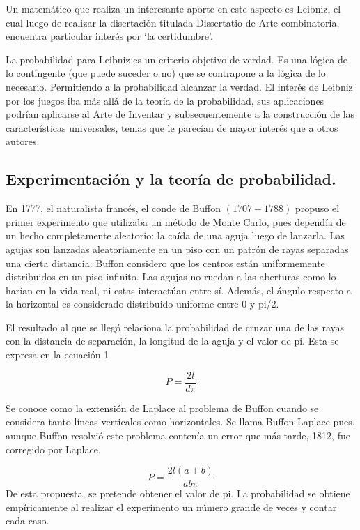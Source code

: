 \documentclass{rbf}
\begin{document}
Un matemático que realiza un interesante aporte en este aspecto es Leibniz, el cual luego de realizar la disertación titulada Dissertatio de Arte combinatoria, encuentra particular interés por ‘la certidumbre’.

La probabilidad para Leibniz es un criterio objetivo de verdad. Es una lógica de lo contingente (que puede suceder o no) que se contrapone a la lógica de lo necesario. Permitiendo a la probabilidad alcanzar la verdad. El interés de Leibniz por los juegos iba más allá de la teoría de la probabilidad, sus aplicaciones podrían aplicarse al Arte de Inventar y subsecuentemente a la construcción de las características universales, temas que le parecían de mayor interés que a otros autores.\cite{Charles}
\subsection{Experimentación y la teoría de probabilidad.}
En 1777, el naturalista francés, el conde de Buffon $(1707-1788)$ propuso el primer experimento que utilizaba un método de Monte Carlo, pues dependía de un hecho completamente aleatorio: la caída de una aguja luego de lanzarla. Las agujas son lanzadas aleatoriamente en un piso con un patrón de rayas separadas una cierta distancia. Buffon considero que los centros están uniformemente distribuidos en un piso infinito. Las agujas no ruedan a las aberturas como lo harían en la vida real, ni estas interactúan entre sí. Además, el ángulo respecto a la horizontal es considerado distribuido uniforme entre 0 y pi/2.

El resultado al que se llegó relaciona la probabilidad de cruzar una de las rayas con la distancia de separación, la longitud de la aguja y el valor de pi. Esta se expresa en la ecuación 1

\begin{equation}
    P=\frac{2l}{d\pi}
\end{equation}

Se conoce como la extensión de Laplace al problema de Buffon cuando se considera tanto líneas verticales como horizontales. Se llama Buffon-Laplace pues, aunque Buffon resolvió este problema contenía un error que más tarde, 1812, fue corregido por Laplace.

\begin{equation}
    P=\frac{2l(a+b)}{ab\pi}
\end{equation}
De esta propuesta, se pretende obtener el valor de pi. La probabilidad se obtiene empíricamente al realizar el experimento un número grande de veces y contar cada caso.
\end{document}
